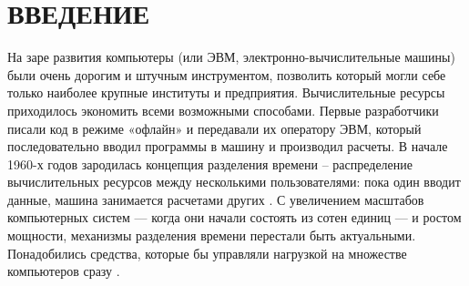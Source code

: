 \chapter*{ВВЕДЕНИЕ}
\begin{comment}
Современные приложения должны обрабатывать запросы миллионов пользователей одновременно, а также возвращать каждому пользователю правильный текст, видео, изображения и другие данные. Для обработки таких значительных объемов трафика в большинстве приложений используется множество серверов ресурсов с дублированием данных между ними.
Балансировка нагрузки направляет и контролирует интернет-трафик между серверами приложений и их посетителями или клиентами. В результате повышается доступность, масштабируемость, безопасность и производительность приложения. Алгоритм балансировки нагрузки – это набор правил, которым следует балансировщик нагрузки для определения наилучшего сервера для каждого из различных клиентских запросов.\cite{balance}

Системы, работающие с высокой нагрузкой, такие как веб-серверы, облачные платформы, базы данных и другие, требуют эффективной балансировки нагрузки для обеспечения стабильной и надежной работы.


Цель работы - исследование методов балансировки высоконагруженных систем.

В вычислительной технике балансировка нагрузки улучшает распределение рабочих нагрузок по нескольким вычислительным ресурсам: компьютерам, компьютерным кластерам, сетевым подключениям, центральным процессорам или дисковым устройствам. Балансировка нагрузки призвана оптимизировать использование ресурсов, максимально увеличить пропускную способность, минимизировать время отклика и избежать перегрузки отдельных ресурсов. Применение вместо одного компонента нескольких компонентов с балансировкой может повысить надёжность и доступность благодаря получившемуся запасу мощностей. Балансировка нагрузки обычно подразумевает использование специального ПО или оборудования вроде многоуровневого коммутатора или DNS-сервера.\cite{3}
\end{comment}

На заре развития компьютеры (или ЭВМ, электронно-вычислительные машины) были очень дорогим и штучным инструментом, позволить который могли себе только наиболее крупные институты и предприятия.
Вычислительные ресурсы приходилось экономить всеми возможными способами.
Первые разработчики писали код в режиме «офлайн» и передавали их оператору ЭВМ, который последовательно вводил программы в машину и производил расчеты.
В начале 1960-х годов зародилась концепция разделения времени – распределение вычислительных ресурсов между несколькими пользователями: пока один вводит данные, машина занимается расчетами других \cite{2}.
С увеличением масштабов компьютерных систем — когда они начали состоять из сотен единиц — и ростом мощности, механизмы разделения времени перестали быть актуальными.
Понадобились средства, которые бы управляли нагрузкой на множестве компьютеров сразу \cite{1}. 

